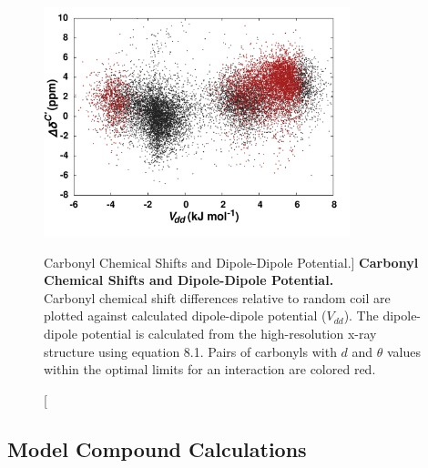 \begin{figure}
\includegraphics[width=3.5in]{figs/npistar/03.png}
\caption
      [Carbonyl \cnmr{} Chemical Shifts and Dipole-Dipole Potential.]{
  {\bf Carbonyl \cnmr{} Chemical Shifts and Dipole-Dipole Potential.}
  \\
  Carbonyl \cnmr{} chemical shift differences relative to random coil are
  plotted against calculated dipole-dipole potential ($V_{dd}$). The
  dipole-dipole potential is calculated from the high-resolution x-ray
  structure using equation 8.1. Pairs of carbonyls with $d$ and $\theta$
  values within the optimal limits for an \npistar{} interaction are colored
  red.
}
\end{figure}

\subsection{Model Compound Calculations}

